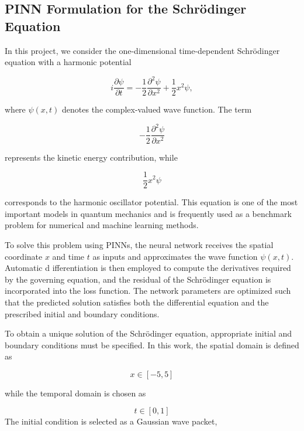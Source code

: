 \documentclass[11pt]{article}
\begin{document}
\subsection{PINN Formulation for the Schrödinger Equation}

In this project, we consider the one-dimensional time-dependent 
Schrödinger equation with a harmonic potential

\begin{equation}
	i\frac{\partial \psi}{\partial t}
	=
	-\frac{1}{2}\frac{\partial^2 \psi}{\partial x^2}
	+
	\frac{1}{2}x^2\psi,
\end{equation}

where $\psi(x,t)$ denotes the complex-valued wave function. The term

\begin{equation}
	-\frac{1}{2}\frac{\partial^2 \psi}{\partial x^2}
\end{equation}

represents the kinetic energy contribution, while

\begin{equation}
	\frac{1}{2}x^2\psi
\end{equation}

corresponds to the harmonic oscillator potential. 
This equation is one of the most important models in 
quantum mechanics and is frequently used as a benchmark 
problem for numerical and machine learning methods.

To solve this problem using PINNs, the neural 
network receives the spatial coordinate 
$x$ and time $t$ as inputs and approximates 
the wave function $\psi(x,t)$. Automatic d
ifferentiation is then employed to compute 
the derivatives required by the governing equation, 
and the residual of the Schrödinger equation is 
incorporated into the loss function. The network 
parameters are optimized such that the predicted 
solution satisfies both the differential equation 
and the prescribed initial and boundary conditions.


To obtain a unique solution of the Schrödinger equation, 
appropriate initial and boundary conditions must be specified.
In this work, the spatial domain is defined as

\begin{equation}
	x \in [-5,5]
\end{equation}


while the temporal domain is chosen as

\begin{equation}
	t \in [0,1]
\end{equation}
The initial condition is selected as a Gaussian wave packet,
\end{document}
